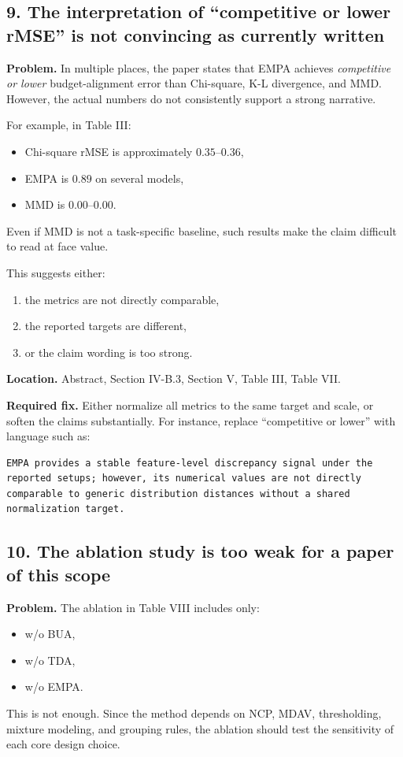 \subsection*{9. The interpretation of ``competitive or lower rMSE'' is not convincing as currently written}

\textbf{Problem.}  
In multiple places, the paper states that EMPA achieves \emph{competitive or lower} budget-alignment error than Chi-square, K-L divergence, and MMD. However, the actual numbers do not consistently support a strong narrative.

For example, in Table III:
\begin{itemize}
\item Chi-square rMSE is approximately $0.35$--$0.36$,
\item EMPA is $0.89$ on several models,
\item MMD is $0.00$--$0.00$.
\end{itemize}
Even if MMD is not a task-specific baseline, such results make the claim difficult to read at face value.

This suggests either:
\begin{enumerate}
\item the metrics are not directly comparable,
\item the reported targets are different,
\item or the claim wording is too strong.
\end{enumerate}

\textbf{Location.}  
Abstract, Section IV-B.3, Section V, Table III, Table VII.

\textbf{Required fix.}  
Either normalize all metrics to the same target and scale, or soften the claims substantially. For instance, replace ``competitive or lower'' with language such as:

\begin{verbatim}
EMPA provides a stable feature-level discrepancy signal under the
reported setups; however, its numerical values are not directly
comparable to generic distribution distances without a shared
normalization target.
\end{verbatim}

\subsection*{10. The ablation study is too weak for a paper of this scope}

\textbf{Problem.}  
The ablation in Table VIII includes only:
\begin{itemize}
\item w/o BUA,
\item w/o TDA,
\item w/o EMPA.
\end{itemize}
This is not enough. Since the method depends on NCP, MDAV, thresholding, mixture modeling, and grouping rules, the ablation should test the sensitivity of each core design choice.

